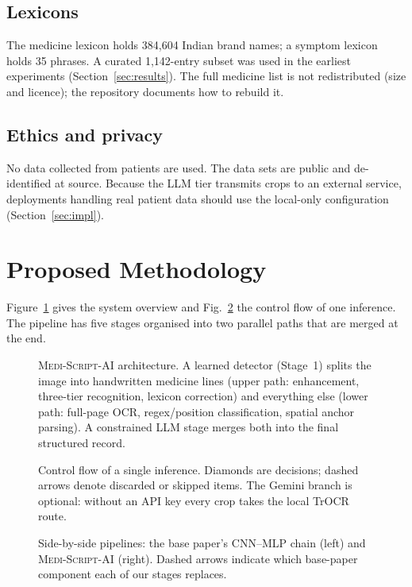 \documentclass[journal]{IEEEtran}
\newcommand{\sys}{\textsc{Medi-Script-AI}}
\begin{document}
\subsection{Lexicons}
The medicine lexicon holds 384{,}604 Indian brand names; a symptom lexicon holds 35 phrases. A curated 1{,}142-entry subset was used in the earliest experiments (Section~\ref{sec:results}). The full medicine list is not redistributed (size and licence); the repository documents how to rebuild it.

\subsection{Ethics and privacy}
No data collected from patients are used. The data sets are public and de-identified at source. Because the LLM tier transmits crops to an external service, deployments handling real patient data should use the local-only configuration (Section~\ref{sec:impl}).

\section{Proposed Methodology}\label{sec:method}
Figure~\ref{fig:arch} gives the system overview and Fig.~\ref{fig:flow} the control flow of one inference. The pipeline has five stages organised into two parallel paths that are merged at the end.

\begin{figure}[t]
\centering
\resizebox{\textwidth}{!}{}
\caption{\sys{} architecture. A learned detector (Stage~1) splits the image into handwritten medicine lines (upper path: enhancement, three-tier recognition, lexicon correction) and everything else (lower path: full-page OCR, regex/position classification, spatial anchor parsing). A constrained LLM stage merges both into the final structured record.}
\label{fig:arch}
\end{figure}

\begin{figure}[t]
\centering
\resizebox{\textwidth}{!}{}
\caption{Control flow of a single inference. Diamonds are decisions; dashed arrows denote discarded or skipped items. The Gemini branch is optional: without an API key every crop takes the local TrOCR route.}
\label{fig:flow}
\end{figure}

\begin{figure}[t]
\centering
\resizebox{!}{0.40\textheight}{}
\caption{Side-by-side pipelines: the base paper's CNN--MLP chain (left) and \sys{} (right). Dashed arrows indicate which base-paper component each of our stages replaces.}
\label{fig:compare}
\end{figure}
\end{document}
